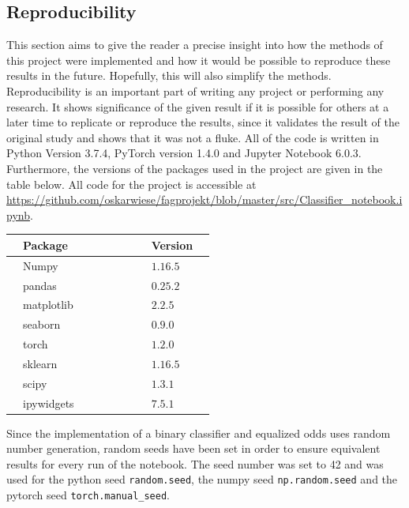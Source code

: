 \documentclass[11pt, fleqn, titlepage]{article}
\begin{document}
	\subsection{Reproducibility}\label{repro}
	This section aims to give the reader a precise insight into how the methods of this project were implemented and how it would be possible to reproduce these results in the future. Hopefully, this will also simplify the methods. Reproducibility is an important part of writing any project or performing any research. It shows significance of the given result if it is possible for others at a later time to replicate or reproduce the results, since it validates the result of the original study and shows that it was not a fluke. All of the code is written in Python Version 3.7.4, PyTorch version 1.4.0 and Jupyter Notebook 6.0.3. Furthermore, the versions of the packages used in the project are given in the table below. All code for the project is accessible at \url{https://github.com/oskarwiese/fagprojekt/blob/master/src/Classifier_notebook.ipynb}.
	\begin{table}[H]
		\begin{center}
			\begin{tabular}{l l l l l l l l l l}
				\toprule
				& \textbf{Package}      & & & & & & & \textbf{Version}  & \\ \midrule
				& Numpy        & & & & & & & $1.16.5$ & \\
				& pandas       & & & & & & & $0.25.2$ & \\
				& matplotlib   & & & & & & & $2.2.5$  & \\
				& seaborn      & & & & & & & $0.9.0$  & \\
				& torch        & & & & & & & $1.2.0$  & \\
				& sklearn      & & & & & & & $1.16.5$ & \\
				& scipy        & & & & & & & $1.3.1$  & \\
				& ipywidgets   & & & & & & & $7.5.1$  & \\ \bottomrule
			\end{tabular}
		\end{center}
	\end{table}
	\noindent Since the implementation of a binary classifier and equalized odds uses random number generation, random seeds have been set in order to ensure equivalent results for every run of the notebook. The seed number was set to 42 and was used for the python seed \texttt{random.seed}, the numpy seed \texttt{np.random.seed} and the pytorch seed \texttt{torch.manual\_seed}.
	
\end{document}
